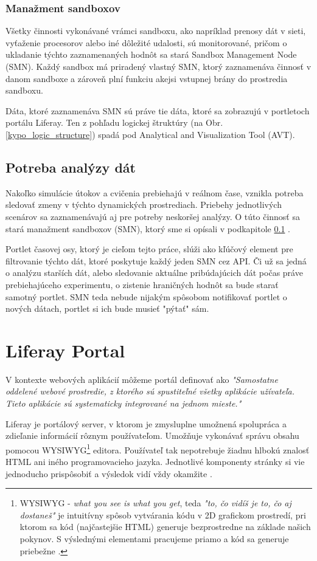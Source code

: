 \documentclass[
  digital, %
  twoside, %
  notable,   %
  nolof,   %
  nolot,   %
]{fithesis3}
\begin{document}
\subsection{Manažment sandboxov}
\label{smn}
Všetky činnosti vykonávané vrámci sandboxu, ako napríklad prenosy dát v sieti, vyťaženie procesorov alebo iné dôležité udalosti, sú monitorované, pričom o ukladanie týchto zaznamenaných hodnôt sa stará Sandbox Management Node (SMN). Každý sandbox má priradený vlastný SMN, ktorý zaznamenáva činnosť v danom sandboxe a zároveň plní funkciu akejsi vstupnej brány do prostredia sandboxu\cite{eichler2014analytical}.

Dáta, ktoré zaznamenáva SMN sú práve tie dáta, ktoré sa zobrazujú v portletoch portálu Liferay. Ten z pohľadu logickej štruktúry (na Obr. \ref{kypo_logic_structure}) spadá pod Analytical and Visualization Tool (AVT).

\section{Potreba analýzy dát}
Nakoľko simulácie útokov a cvičenia prebiehajú v reálnom čase, vznikla potreba sledovať zmeny v týchto dynamických prostrediach. Priebehy jednotlivých scenárov sa zaznamenávajú aj pre potreby neskoršej analýzy. O túto činnosť sa stará manažment sandboxov (SMN), ktorý sme si opísali v podkapitole \ref{smn} .

Portlet časovej osy, ktorý je cieľom tejto práce, slúži ako kľúčový element pre filtrovanie týchto dát, ktoré poskytuje každý jeden SMN cez API. Či už sa jedná o analýzu starších dát, alebo sledovanie aktuálne pribúdajúcich dát počas práve prebiehajúceho experimentu, o zistenie hraničných hodnôt sa bude starať samotný portlet. SMN teda nebude nijakým spôsobom notifikovať portlet o nových dátach, portlet si ich bude musieť "pýtať" sám.

\chapter{Liferay Portal}
\label{liferay}
V kontexte webových aplikácií môžeme portál definovať \cite{sezov2011liferay} ako \textit{"Samostatne oddelené webové prostredie, z ktorého sú spustiteľné všetky aplikácie užívateľa. Tieto aplikácie sú systematicky integrované na jednom mieste."}

Liferay je portálový server, v ktorom je zmysluplne umožnená spolupráca a zdieľanie informácií rôznym používateľom. Umožňuje vykonávať správu obsahu pomocou WYSIWYG\footnote{WYSIWYG - \textit{what you see is what you get}, teda \textit{"to, čo vidíš je to, čo aj dostaneš"} je intuitívny spôsob vytvárania kódu v 2D grafickom prostredí, pri ktorom sa kód (najčastejšie HTML) generuje bezprostredne na základe našich pokynov. S výslednými elementami pracujeme priamo a kód sa generuje priebežne \cite{guo2011wysiwyg}.} editora. Používateľ tak nepotrebuje žiadnu hlbokú znalosť HTML ani iného programovacieho jazyka. Jednotlivé komponenty stránky si vie jednoducho prispôsobiť a výsledok vidí vždy okamžite \cite{sezov2011liferay}.
\end{document}
